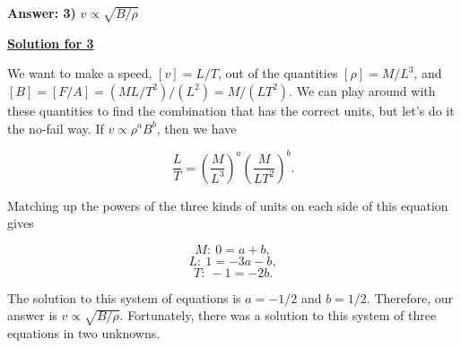\textbf{Answer: 3)} $v \propto \sqrt{B/\rho}$

\underline{\textbf{Solution for 3}}

We want to make a speed, $[v] = L/T$, out of the quantities $[\rho] = M/L^3$, and $[B] = [F/A] = (ML/T^2)/(L^2) = M/(LT^2)$. We can play around with these quantities to find the combination that has the correct units, but let's do it the no-fail way. If $v \propto \rho^a B^b$, then we have

\begin{equation} \frac{L}{T} = \left(\frac{M}{L^3}\right)^a \left(\frac{M}{LT^2}\right)^b. \tag{1.21} \end{equation}

Matching up the powers of the three kinds of units on each side of this equation gives

\begin{equation} M:\ 0 = a+b, \end{equation}
\begin{equation} L:\ 1 = -3a-b, \end{equation}
\begin{equation} T:\ -1 = -2b. \tag{1.22} \end{equation}

The solution to this system of equations is $a = -1/2$ and $b = 1/2$. Therefore, our answer is $v \propto \sqrt{B/\rho}$. Fortunately, there was a solution to this system of three equations in two unknowns.